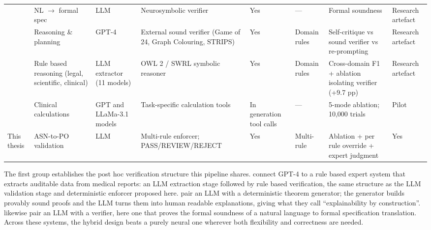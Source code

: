 \begin{table}[htbp]
\begin{adjustbox}{max width=\textwidth}
\begin{tabular}{@{}p{2.0cm}p{1.7cm}p{1.5cm}p{2.3cm}p{1.5cm}p{1.2cm}p{2.6cm}p{1.6cm}@{}}
\citet{bayless2025}               & NL $\to$ formal spec                          & LLM                    & Neurosymbolic verifier                                   & Yes                        & ---             & Formal soundness                                        & Research artefact   \\
\citet{stechly2024}               & Reasoning \& planning                         & GPT-4                  & External sound verifier (Game of 24, Graph Colouring, STRIPS) & Yes                   & Domain rules    & Self-critique vs sound verifier vs re-prompting         & Research artefact   \\
\citet{sadowski2026}              & Rule based reasoning (legal, scientific, clinical) & LLM extractor (11 models) & OWL 2 / SWRL symbolic reasoner                       & Yes                        & Domain rules    & Cross-domain F1 + ablation isolating verifier (+9.7 pp) & Research artefact   \\
\citet{goodell2025}               & Clinical calculations                         & GPT and LLaMa-3.1 models         & Task-specific calculation tools                          & In generation tool calls   & ---             & 5-mode ablation; 10,000 trials                          & Pilot               \\
This thesis                       & ASN-to-PO validation                          & LLM                    & Multi-rule enforcer; PASS/REVIEW/REJECT                  & Yes                        & Multi-rule      & Ablation + per rule override + expert judgment          & Yes                 \\
\bottomrule
\end{tabular}
\end{adjustbox}
\end{table}

The first group establishes the post hoc verification structure this pipeline shares. \citet{prenosil2025} connect GPT-4 to a rule based expert system that extracts auditable data from medical reports: an LLM extraction stage followed by rule based verification, the same structure as the LLM validation stage and deterministic enforcer proposed here. \citet{xu2025} pair an LLM with a deterministic theorem generator; the generator builds provably sound proofs and the LLM turns them into human readable explanations, giving what they call ``explainability by construction''. \citet{bayless2025} likewise pair an LLM with a verifier, here one that proves the formal soundness of a natural language to formal specification translation. Across these systems, the hybrid design beats a purely neural one wherever both flexibility and correctness are needed.

